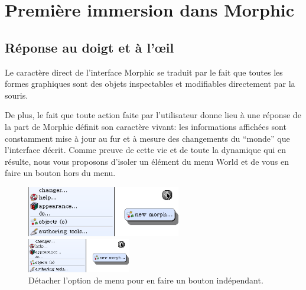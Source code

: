 \documentclass[a4paper,10pt,twoside]{book}
\begin{document}
\section{Première immersion dans Morphic}

\subsection{Réponse au doigt et \`a l'\oe il}
Le caractère direct de l'interface Morphic se traduit par le fait
que toutes les formes graphiques sont des objets 
inspectables et modifiables directement par la souris.

De plus, le fait que toute action faite par l'utilisateur donne lieu
\`a une réponse de la part de Morphic définit son caractère
vivant: les informations affichées sont constamment mise \`a jour
au fur et \`a mesure des changements du ``monde'' que l'interface
décrit. 
Comme preuve de cette vie et de toute la dynamique qui en résulte,
nous vous proposons d'isoler un élément du menu World et de vous
en faire un bouton hors du menu.


\begin{figure}[ht]
	\ifluluelse
		{\centerline{\includegraphics[width=0.6\textwidth]{detachingMenu}}}
		{\centerline{\includegraphics[width=0.4\textwidth]{detachingMenu}}}
	\caption{Détacher l'option de menu  pour
      en faire un bouton indépendant.\label{fig:detachingMenu}}
\end{figure}
\end{document}
